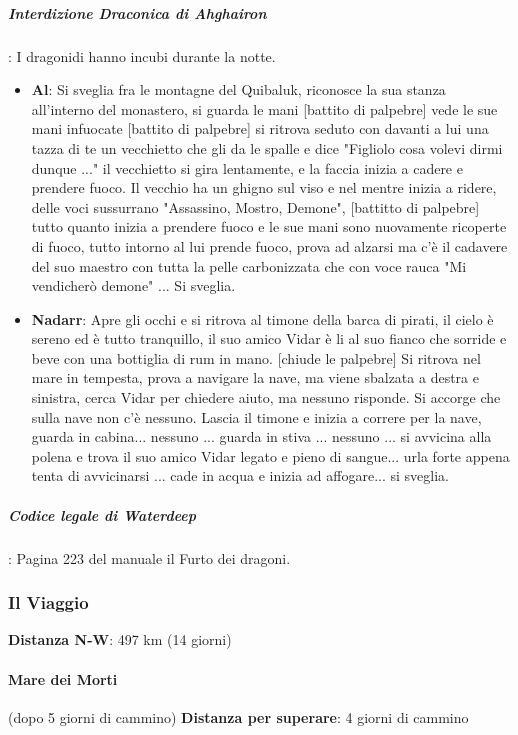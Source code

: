 \documentclass{article}
\begin{document}
                        \subparagraph{Interdizione Draconica di Ahghairon}: I dragonidi hanno incubi durante la notte. 
\begin{itemize}
    \item \textbf{Al}: Si sveglia fra le montagne del Quibaluk, riconosce la sua stanza all'interno del monastero, si guarda le mani [battito di palpebre] vede le sue mani infuocate [battito di palpebre] si ritrova seduto con davanti a lui una tazza di te un vecchietto che gli da le spalle e dice "Figliolo cosa volevi dirmi dunque ..." il vecchietto si gira lentamente, e la faccia inizia a cadere e prendere fuoco. Il vecchio ha un ghigno sul viso e nel mentre inizia a ridere, delle voci sussurrano "Assassino, Mostro, Demone", [battitto di palpebre] tutto quanto inizia a prendere fuoco e le sue mani sono nuovamente ricoperte di fuoco, tutto intorno al lui prende fuoco, prova ad alzarsi ma c'è il cadavere del suo maestro con tutta la pelle carbonizzata che con voce rauca "Mi vendicherò demone" ... Si sveglia.
    \item \textbf{Nadarr}: Apre gli occhi e si ritrova al timone della barca di pirati, il cielo è sereno ed è tutto tranquillo, il suo amico Vidar è li al suo fianco che sorride e beve con una bottiglia di rum in mano. [chiude le palpebre] Si ritrova nel mare in tempesta, prova a navigare la nave, ma viene sbalzata a destra e sinistra, cerca Vidar per chiedere aiuto, ma nessuno risponde. Si accorge che sulla nave non c'è nessuno. Lascia il timone e inizia a correre per la nave, guarda in cabina... nessuno ... guarda in stiva ... nessuno ... si avvicina alla polena e trova il suo amico Vidar legato e pieno di sangue... urla forte appena tenta di avvicinarsi ... cade in acqua e inizia ad affogare... si sveglia. 
\end{itemize}


                        \subparagraph{Codice legale di Waterdeep}:  Pagina 223 del manuale il Furto dei dragoni.

            \subsubsection{Il Viaggio}
\textbf{Distanza N-W}: 497 km (14 giorni) 

                \paragraph{Mare dei Morti} (dopo 5 giorni di cammino) 
\textbf{Distanza per superare}: 4 giorni di cammino
\end{document}
